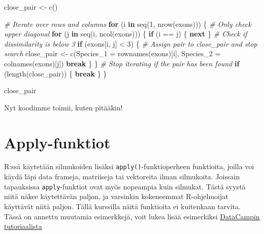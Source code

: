\documentclass[
]{book}
\newenvironment{Shaded}{\begin{snugshade}}{\end{snugshade}}
\newcommand{\AttributeTok}[1]{\textcolor[rgb]{0.77,0.63,0.00}{#1}}
\newcommand{\CommentTok}[1]{\textcolor[rgb]{0.56,0.35,0.01}{\textit{#1}}}
\newcommand{\ControlFlowTok}[1]{\textcolor[rgb]{0.13,0.29,0.53}{\textbf{#1}}}
\newcommand{\DecValTok}[1]{\textcolor[rgb]{0.00,0.00,0.81}{#1}}
\newcommand{\FunctionTok}[1]{\textcolor[rgb]{0.00,0.00,0.00}{#1}}
\newcommand{\NormalTok}[1]{#1}
\newcommand{\OtherTok}[1]{\textcolor[rgb]{0.56,0.35,0.01}{#1}}
\newcommand{\SpecialCharTok}[1]{\textcolor[rgb]{0.00,0.00,0.00}{#1}}
\begin{document}
\begin{Shaded}
\begin{Highlighting}[]
\NormalTok{close\_pair }\OtherTok{\textless{}{-}} \FunctionTok{c}\NormalTok{()}

\CommentTok{\# Iterate over rows and columns}
\ControlFlowTok{for}\NormalTok{ (i }\ControlFlowTok{in} \FunctionTok{seq}\NormalTok{(}\DecValTok{1}\NormalTok{, }\FunctionTok{nrow}\NormalTok{(exons))) \{}
  \CommentTok{\# Only check upper diagonal}
  \ControlFlowTok{for}\NormalTok{ (j }\ControlFlowTok{in} \FunctionTok{seq}\NormalTok{(i, }\FunctionTok{ncol}\NormalTok{(exons))) \{}
    \ControlFlowTok{if}\NormalTok{ (i }\SpecialCharTok{==}\NormalTok{ j) \{}
        \ControlFlowTok{next}
\NormalTok{    \}}
    \CommentTok{\# Check if dissimilarity is below 3}
    \ControlFlowTok{if}\NormalTok{ (exons[i, j] }\SpecialCharTok{\textless{}} \DecValTok{3}\NormalTok{) \{}
      \CommentTok{\# Assign pair to close\_pair and stop search}
\NormalTok{      close\_pair }\OtherTok{\textless{}{-}} \FunctionTok{c}\NormalTok{(}\AttributeTok{Species\_1 =} \FunctionTok{rownames}\NormalTok{(exons)[i],}
                            \AttributeTok{Species\_2 =} \FunctionTok{colnames}\NormalTok{(exons)[j])}
      \ControlFlowTok{break}
\NormalTok{    \}}
\NormalTok{  \}}
  \CommentTok{\# Stop iterating if the pair has been found}
  \ControlFlowTok{if}\NormalTok{ (}\FunctionTok{length}\NormalTok{(close\_pair)) \{}
    \ControlFlowTok{break}
\NormalTok{  \}}
\NormalTok{\}}

\NormalTok{close\_pair}
\end{Highlighting}
\end{Shaded}

Nyt koodimme toimii, kuten pitääkin!

\hypertarget{apply-funktiot}{%
\section{Apply-funktiot}\label{apply-funktiot}}

R:ssä käytetään silmukoiden lisäksi \texttt{apply()}-funktioperheen funktioita, joilla voi käydä läpi data frameja, matriiseja tai vektoreita ilman silmukoita. Joissain tapauksissa \texttt{apply}-funktiot ovat myös nopeampia kuin silmukat. Tästä syystä niitä näkee käytettävän paljon, ja varsinkin kokeneemmat R-ohjelmoijat käyttävät niitä paljon. Tällä kurssilla näitä funktioita ei kuitenkaan tarvita. Tässä on annettu muutamia esimerkkejä, voit lukea lisää esimerkiksi \href{https://www.datacamp.com/community/tutorials/r-tutorial-apply-family}{DataCampin tutoriaalista}
\end{document}

